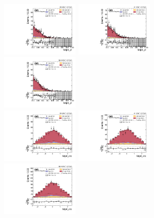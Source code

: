 \begin{figure}[!ht]
  \centering
  \includegraphics[width=0.335\textwidth]{analysis_plots/2016_zv/cr_vjets_l/fatjet_pt.pdf} \hspace{-10pt}
  \includegraphics[width=0.335\textwidth]{analysis_plots/2017_zv/cr_vjets_l/fatjet_pt.pdf} \hspace{-10pt}
  \includegraphics[width=0.335\textwidth]{analysis_plots/2018_zv/cr_vjets_l/fatjet_pt.pdf} \hspace{-10pt} \\
  \includegraphics[width=0.335\textwidth]{analysis_plots/2016_zv/cr_vjets_l/fatjet_eta.pdf} \hspace{-10pt}
  \includegraphics[width=0.335\textwidth]{analysis_plots/2017_zv/cr_vjets_l/fatjet_eta.pdf} \hspace{-10pt}
  \includegraphics[width=0.335\textwidth]{analysis_plots/2018_zv/cr_vjets_l/fatjet_eta.pdf} \hspace{-10pt} \\

\end{figure}
